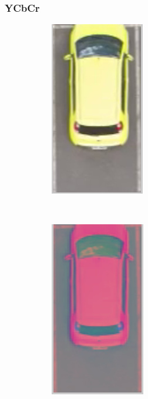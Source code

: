 \documentclass{beamer}
\begin{document}
\begin{frame}
\frametitle{YCbCr}
\begin{figure}
 \centering
 \begin{subfigure}{.2\textwidth}
  \centering
  \includegraphics[width=.5\linewidth]{exemploRGB}
\end{subfigure}\
\begin{subfigure}{.2\textwidth}
  \centering
  \includegraphics[width=.5\linewidth]{exemploycbcr}
\end{subfigure}
\end{figure}


\end{frame}
\end{document}
